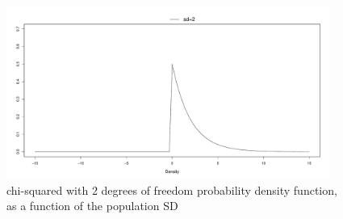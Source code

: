 \documentclass[man,floatsintext]{apa6}
\begin{document}
\begin{appendix}
\begin{figure}
\includegraphics[width=400px]{W-test_files/figure-latex/unnamed-chunk-23-1} \caption{chi-squared with 2 degrees of freedom probability density function, as a function of the population SD}\label{fig:unnamed-chunk-23}
\end{figure}
\end{appendix}
\end{document}

